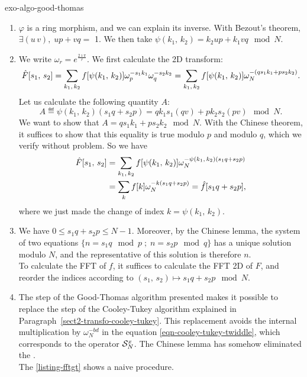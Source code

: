  
\begin{correction}{exo-algo-good-thomas}
\begin{enumerate}
\item {} $ \varphi $ is a ring morphism, and we can explain its inverse. With Bezout's theorem, $ \exists (u \, v), \; up + vq = $ 1. We then take $ \psi (k_1, \, k_2) = k_2 up + k_1 vq \mod{N} $.
\item We write $ \omega_r = e^{\frac{2 \imath \pi}{r}} $. We first calculate the 2D transform:
\begin{equation*}
\hat{F}[s_1, \, s_2] = \sum_{k_1, \, k_2}{f [\psi (k_1, \, k_2)] \omega_p^{- s_1 k_1} \omega_q^{- s_2 k_2}} = \sum_{k_1, \, k_2}{f [\psi (k_1, \, k_2)] \omega_N^{- (q s_1 k_1 + p s_2 k_2)}}.
\end{equation*}
Let us calculate the following quantity $ A $:
\begin{equation*}
A \eqdef \psi (k_1, \, k_2) (s_1 q + s_2 p) = q k_1 s_1 (qv) + p k_2 s_2 (pv) \mod{N}.
\end{equation*}
We want to show that $ A = q s_1 k_1 + p s_2 k_2 \mod{N} $. With the Chinese theorem, it suffices to show that this equality is true modulo $ p $ and modulo $ q $, which we verify without problem. So we have
\begin{align*}
\hat{F}[s_1, \, s_2] & = \sum_{k_1, \, k_2}{f [\psi (k_1, \, k_2)] \omega_N^{- \psi (k_1, \, k_2) (s_1 q + s_2 p)}} \\
& = \sum_{k}{f [k] \omega_N^{- k (s_1 q + s_2 p)}} = \hat{f}[s_1 q + s_2 p],
\end{align*}
where we just made the change of index $ k = \psi (k_1, \, k_2) $.
\item We have $ 0 \leq s_1 q + s_2 p \leq N-1 $. Moreover, by the Chinese lemma, the system of two equations $ \{n = s_1 q \mod{p} \; ; \; n = s_2 p \mod{q}\} $ has a unique solution modulo $ N $, and the representative of this solution is therefore $ n $. \\To calculate the FFT of $ f $, it suffices to calculate the FFT 2D of $ F $, and reorder the indices according to $ (s_1, \, s_2) \mapsto s_1 q + s_2 p \mod{N} $.
\item The step of the Good-Thomas algorithm presented makes it possible to replace the step of the Cooley-Tukey algorithm explained in Paragraph~\ref{sect2-transfo-cooley-tukey}. This replacement avoids the internal multiplication by $ \omega_N^{- bd} $ in the equation \ref{eqn-cooley-tukey-twiddle}, which corresponds to the operator $ \mathcal{S}_N^x $. The Chinese lemma has somehow eliminated the . \\The \listingterme{} \ref{listing-fftgt} shows a naive \Matlab{} procedure.


\end{enumerate}
\end{correction}
